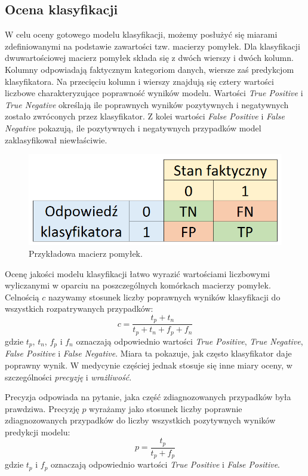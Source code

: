 \documentclass[../thesis.tex]{subfiles}
\begin{document}
\subsection{Ocena klasyfikacji}

W celu oceny gotowego modelu klasyfikacji, możemy posłużyć się miarami zdefiniowanymi na podstawie zawartości tzw. macierzy pomyłek. Dla klasyfikacji dwuwartościowej macierz pomyłek składa się z dwóch wierszy i dwóch kolumn. Kolumny odpowiadają faktycznym kategoriom danych, wiersze zaś predykcjom klasyfikatora. Na przecięciu kolumn i wierszy znajdują się cztery wartości liczbowe charakteryzujące poprawność wyników modelu. Wartości \emph{True Positive} i \emph{True Negative} określają ile poprawnych wyników pozytywnych i negatywnych zostało zwróconych przez klasyfikator. Z kolei wartości \emph{False Positive} i \emph{False Negative} pokazują, ile pozytywnych i negatywnych przypadków model zaklasyfikował niewłaściwie.

\begin{figure}[h]
\centering
\includegraphics[height=.1\textheight]{error_matrix.png}
\caption{Przykładowa macierz pomyłek.}
\label{classification:error_matrix}
\end{figure}

Ocenę jakości modelu klasyfikacji łatwo wyrazić wartościami liczbowymi wyliczanymi w oparciu na poszczególnych komórkach macierzy pomyłek. Celnością $c$ nazywamy stosunek liczby poprawnych wyników klasyfikacji do wszystkich rozpatrywanych przypadków:
\[c = \frac{t_p + t_n}{t_p + t_n + f_p + f_n}\]
gdzie $t_p$, $t_n$, $f_p$ i $f_n$ oznaczają odpowiednio wartości \emph{True Positive}, \emph{True Negative}, \emph{False Positive} i \emph{False Negative}. Miara ta pokazuje, jak często klasyfikator daje poprawny wynik. W medycynie częściej jednak stosuje się inne miary oceny, w szczególności \emph{precyzję} i \emph{wrażliwość}. 

Precyzja odpowiada na pytanie, jaka część zdiagnozowanych przypadków była prawdziwa. Precyzję $p$ wyrażamy jako stosunek liczby poprawnie zdiagnozowanych przypadków do liczby wszystkich pozytywnych wyników predykcji modelu:
\[p = \frac{t_p}{t_p + f_p}\]
gdzie $t_p$ i $f_p$ oznaczają odpowiednio wartości \emph{True Positive} i \emph{False Positive}.
\end{document}
